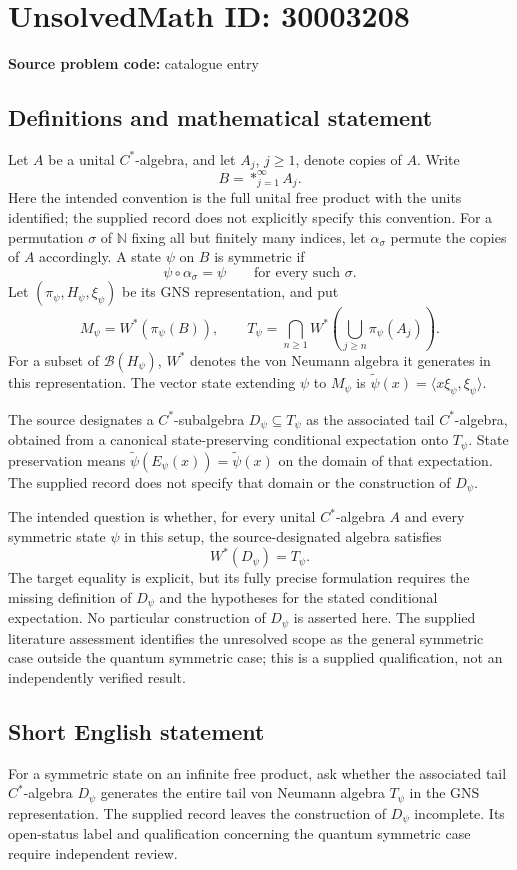 \documentclass[11pt]{article}
\newcommand{\N}{\mathbb{N}}
\begin{document}
\section*{UnsolvedMath ID: 30003208}
\textbf{Source problem code:} catalogue entry
\subsection{Definitions and mathematical statement}
Let \(A\) be a unital \(C^*\)-algebra, and let \(A_j\), \(j\geq 1\), denote copies of \(A\). Write
\[
B=*_{j=1}^{\infty}A_j.
\]
Here the intended convention is the full unital free product with the units identified; the supplied record does not explicitly specify this convention. For a permutation \(\sigma\) of \(\N\) fixing all but finitely many indices, let \(\alpha_\sigma\) permute the copies of \(A\) accordingly. A state \(\psi\) on \(B\) is symmetric if
\[
\psi\circ\alpha_\sigma=\psi
\qquad\text{for every such }\sigma.
\]
Let \((\pi_\psi,H_\psi,\xi_\psi)\) be its GNS representation, and put
\[
M_\psi=W^*(\pi_\psi(B)),\qquad
T_\psi=\bigcap_{n\geq1}W^*\!\left(\bigcup_{j\geq n}\pi_\psi(A_j)\right).
\]
For a subset of \(\mathcal B(H_\psi)\), \(W^*\) denotes the von Neumann algebra it generates in this representation. The vector state extending \(\psi\) to \(M_\psi\) is \(\widetilde\psi(x)=\langle x\xi_\psi,\xi_\psi\rangle\).

The source designates a \(C^*\)-subalgebra \(D_\psi\subseteq T_\psi\) as the associated tail \(C^*\)-algebra, obtained from a canonical state-preserving conditional expectation onto \(T_\psi\). State preservation means \(\widetilde\psi(E_\psi(x))=\widetilde\psi(x)\) on the domain of that expectation. The supplied record does not specify that domain or the construction of \(D_\psi\).

The intended question is whether, for every unital \(C^*\)-algebra \(A\) and every symmetric state \(\psi\) in this setup, the source-designated algebra satisfies
\[
W^*(D_\psi)=T_\psi.
\]
The target equality is explicit, but its fully precise formulation requires the missing definition of \(D_\psi\) and the hypotheses for the stated conditional expectation. No particular construction of \(D_\psi\) is asserted here. The supplied literature assessment identifies the unresolved scope as the general symmetric case outside the quantum symmetric case; this is a supplied qualification, not an independently verified result.
\subsection{Short English statement}
For a symmetric state on an infinite free product, ask whether the associated tail \(C^*\)-algebra \(D_\psi\) generates the entire tail von Neumann algebra \(T_\psi\) in the GNS representation. The supplied record leaves the construction of \(D_\psi\) incomplete. Its open-status label and qualification concerning the quantum symmetric case require independent review.
\end{document}
